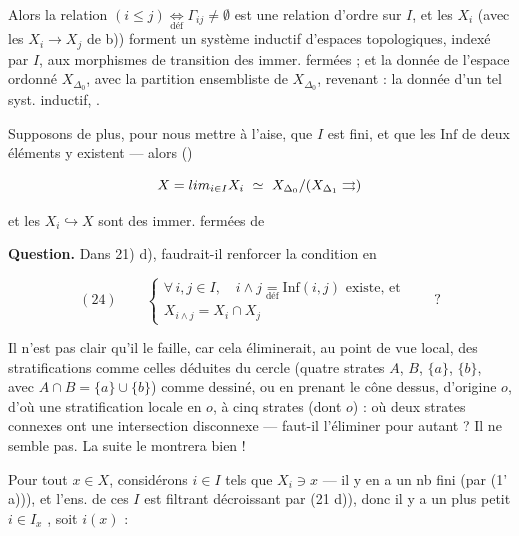 \documentclass[11pt,a4paper]{article}
\begin{document}
Alors la relation $(i \leq j) \underset{\text{déf}}{\iff} \Gamma_{ij} \neq
\emptyset$ est une relation d'ordre sur $I$, \struck{\ill} et les $X_i$ (avec
les $X_i \to X_j$ de b)) forment un système inductif d'espaces topologiques,
indexé par $I$, aux morphismes de transition des immer. fermées ; et la donnée
de l'espace  ordonné $X_{\Delta_0}$,  avec la
partition ensembliste de $X_{\Delta_0}$, revenant : la donnée d'un tel syst.
inductif, .

 Supposons de plus, pour nous mettre à l'aise, que $I$ est
fini, et que les $\mathrm{Inf}$ de deux éléments y existent — alors (\ill)

\[
  X = \varinjlim_{i \in I} X_i
  \ \simeq\ X_{\Delta_0} / (X_{\Delta_1} \rightrightarrows)
\]

et les $X_i \hookrightarrow X$ sont des immer. fermées de \ill

\textbf{Question.} Dans 21) d), faudrait-il renforcer la condition en

\[
  (24) \qquad
  \begin{cases}
    \forall\, i,j \in I, \quad i \wedge j \underset{\text{déf}}{=}
      \mathrm{Inf}(i,j) \text{ existe, et} \\[2pt]
    X_{i \wedge j} = X_i \cap X_j
  \end{cases}
  \qquad ?
\]

Il n'est pas clair qu'il le faille, car cela éliminerait, 
au point de vue local, des stratifications comme celles déduites du cercle
(quatre strates $A$, $B$, $\{a\}$, $\{b\}$, avec
$A \cap B = \{a\} \cup \{b\}$) comme dessiné, ou en prenant le cône dessus,
\struck{\ill} d'origine $o$, d'où une stratification locale en $o$, à cinq
strates (dont $o$) : où deux strates connexes ont une intersection disconnexe
— faut-il l'éliminer pour autant ? \struck{\ill} \struck{\ill} Il ne semble
pas. La suite le montrera bien !


Pour tout $x \in X$, considérons  
$i \in I$ tels que $X_i \ni x$ — il y en a un nb fini \struck{\ill} (par
(1' a))), et l'ens. de ces $I$ est filtrant décroissant par (21 d)), donc il y
a un plus petit $i \in I_x$ , soit $i(x)$ :
\end{document}
